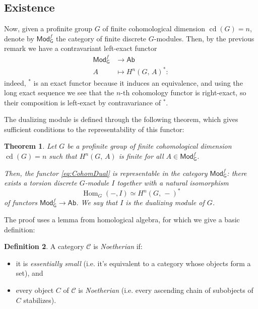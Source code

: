 \documentclass[a4paper, oneside]{memoir}
\def\Gfmod{\mathsf{Mod}_{\mathsf{G}}^f}
\def\Ab{\mathsf{Ab}}
\renewcommand{\H}[3]{H^{#1}( #2, \, #3 )}
\DeclareMathOperator{\Hom}{Hom}
\DeclareMathOperator{\cd}{cd}
\theoremstyle{plain}
\newtheorem{theorem}{Theorem}[section]
\theoremstyle{definition}
\newtheorem{definition}[theorem]{Definition}
\theoremstyle{remark}
\begin{document}
\subsection{Existence}

Now, given a profinite group \(G\) of finite cohomological dimension \(\cd(G)=n\), denote by \(\Gfmod\) the category of finite discrete \(G\)-modules.
Then, by the previous remark we have a contravariant left-exact functor
\begin{align}\label{eq:CohomDual}
    \Gfmod & \to \Ab                \\
    A      & \mapsto \H{n}{G}{A}^*:
\end{align}
indeed, \(^*\) is an exact functor because it induces an equivalence, and using the long exact sequence we see that the \(n\)-th cohomology functor is right-exact, so their composition is left-exact by contravariance of \(^*\).

The dualizing module is defined through the following theorem, which gives sufficient conditions to the representability of this functor:

\begin{theorem}\label{thm:DualMod}
    Let \(G\) be a profinite group of finite cohomological dimension \(\cd(G)=n\) such that \(\H{n}{G}{A}\) is finite for all \(A\in\Gfmod\).

    Then, the functor \eqref{eq:CohomDual} is representable in the category \(\Gfmod\): there exists a torsion discrete \(G\)-module \(I\) together with a natural isomorphism
    \[
        \Hom_G\left( -,I \right) \simeq \H{n}{G}{-}^*
    \]
    of functors \(\Gfmod\to\Ab\). We say that \(I\) is the \textit{dualizing module} of \(G\).
\end{theorem}

The proof uses a lemma from homological algebra, for which we give a basic definition:

\begin{definition}
    A category \(\mathcal{C}\) is \textit{Noetherian} if:
    \begin{itemize}
        \item it is \textit{essentially small} (i.e. it's equivalent to a category whose objects form a set), and
        \item every object \(C\) of \(\mathcal{C}\) is \textit{Noetherian} (i.e. every ascending chain of subobjects of \(C\) stabilizes).
    \end{itemize}
\end{definition}
\end{document}
